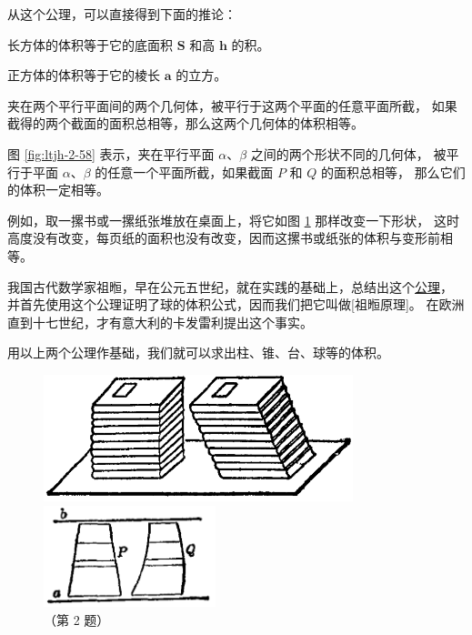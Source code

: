 从这个公理，可以直接得到下面的推论：

\begin{tuilun}[推论1][tl:5-1]
    长方体的体积等于它的底面积 $\bm{S}$ 和高 $\bm{h}$ 的积。
    \begin{center}
    \end{center}
\end{tuilun}


\begin{tuilun}[推论2][tl:5-2]
    正方体的体积等于它的棱长 $\bm{a}$ 的立方。
    \begin{center}
    \end{center}
\end{tuilun}

\begin{gongli}[公理6][gl:6]
    夹在两个平行平面间的两个几何体，被平行于这两个平面的任意平面所截，
    如果截得的两个截面的面积总相等，那么这两个几何体的体积相等。
\end{gongli}

图 \ref{fig:ltjh-2-58} 表示，夹在平行平面 $\alpha$、$\beta$ 之间的两个形状不同的几何体，
被平行于平面 $\alpha$、$\beta$ 的任意一个平面所截，如果截面 $P$ 和 $Q$ 的面积总相等，
那么它们的体积一定相等。

例如，取一摞书或一摞纸张堆放在桌面上，将它如图 \ref{fig:ltjh-2-59} 那样改变一下形状，
这时高度没有改变，每页纸的面积也没有改变，因而这摞书或纸张的体积与变形前相等。

我国古代数学家祖暅，早在公元五世纪，就在实践的基础上，总结出这个\hyperref[gl:6]{公理}，
并首先使用这个公理证明了球的体积公式，因而我们把它叫做[祖暅原理]。
在欧洲直到十七世纪，才有意大利的卡发雷利提出这个事实。

用以上两个公理作基础，我们就可以求出柱、锥、台、球等的体积。

\begin{figure}[htbp]
    \centering
    \begin{minipage}[b]{9cm}
        \centering
        \includegraphics[width=9cm]{../pic/ltjh-ch2-59.png}
        \caption{}\label{fig:ltjh-2-59}
    \end{minipage}
    \qquad
    \begin{minipage}[b]{5cm}
        \centering
        \includegraphics[width=5cm]{../pic/ltjh-ch2-subsec7-lx-02.png}
        \caption*{（第 2 题）}
    \end{minipage}
\end{figure}


